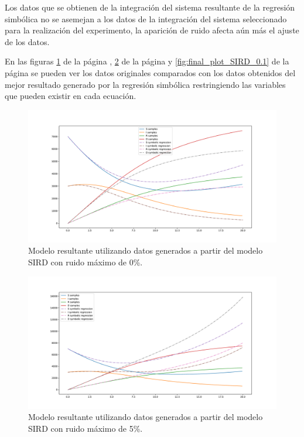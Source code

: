 Los datos que se obtienen de la integración del sistema resultante de la regresión simbólica no se asemejan a los datos de la integración del sistema seleccionado para la realización del experimento, la aparición de ruido afecta aún más el ajuste de los datos.

En las figuras \ref{fig:final_plot_SIRD_0.0} de la página \pageref{fig:final_plot_SIRD_0.0}, \ref{fig:final_plot_SIRD_0.05} de la página \pageref{fig:final_plot_SIRD_0.05} y \ref{fig:final_plot_SIRD_0.1} de la página \pageref{fig:final_plot_SIRD_0.1} se pueden ver los datos originales comparados con los datos obtenidos del mejor resultado generado por la regresión simbólica restringiendo las variables que pueden existir en cada ecuación.

\begin{figure}[h]
    \centering
    \includegraphics[width=\textwidth]{"figures/final_plot_SIRD_0.0.pdf"}
    \caption{Modelo resultante utilizando datos generados a partir del modelo SIRD con ruido máximo de 0\%.}
    \label{fig:final_plot_SIRD_0.0}
\end{figure}

\begin{figure}[h]
    \centering
    \includegraphics[width=\textwidth]{"figures/final_plot_SIRD_0.05.pdf"}
    \caption{Modelo resultante utilizando datos generados a partir del modelo SIRD con ruido máximo de 5\%.}
    \label{fig:final_plot_SIRD_0.05}
\end{figure}

